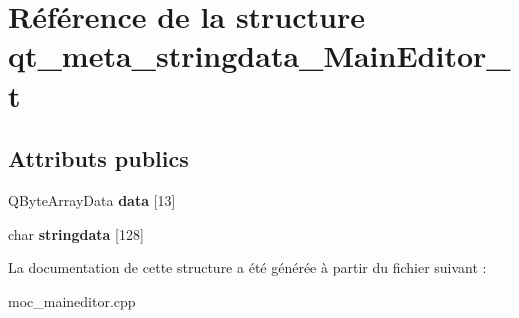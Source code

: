 \hypertarget{structqt__meta__stringdata__MainEditor__t}{\section{Référence de la structure qt\+\_\+meta\+\_\+stringdata\+\_\+\+Main\+Editor\+\_\+t}
\label{structqt__meta__stringdata__MainEditor__t}
}
\subsection*{Attributs publics}
\begin{DoxyCompactItemize}
\item 
\hypertarget{structqt__meta__stringdata__MainEditor__t_ac7ca6f971a202a23e74ec13ff08226c7}{Q\+Byte\+Array\+Data {\bfseries data} \mbox{[}13\mbox{]}}\label{structqt__meta__stringdata__MainEditor__t_ac7ca6f971a202a23e74ec13ff08226c7}

\item 
\hypertarget{structqt__meta__stringdata__MainEditor__t_a007c973a9450cf0a19ffc8d364595c03}{char {\bfseries stringdata} \mbox{[}128\mbox{]}}\label{structqt__meta__stringdata__MainEditor__t_a007c973a9450cf0a19ffc8d364595c03}

\end{DoxyCompactItemize}


La documentation de cette structure a été générée à partir du fichier suivant \+:\begin{DoxyCompactItemize}
\item 
moc\+\_\+maineditor.\+cpp\end{DoxyCompactItemize}
